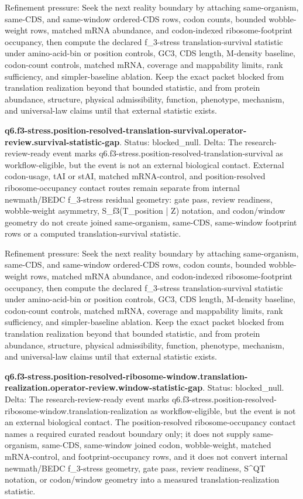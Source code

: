 Refinement pressure: Seek the next reality boundary by attaching same-organism, same-CDS, and same-window ordered-CDS rows, codon counts, bounded wobble-weight rows, matched mRNA abundance, and codon-indexed ribosome-footprint occupancy, then compute the declared f\_3-stress translation-survival statistic under amino-acid-bin or position controls, GC3, CDS length, M-density baseline, codon-count controls, matched mRNA, coverage and mappability limits, rank sufficiency, and simpler-baseline ablation. Keep the exact packet blocked from translation realization beyond that bounded statistic, and from protein abundance, structure, physical admissibility, function, phenotype, mechanism, and universal-law claims until that external statistic exists.

\textbf{q6.f3-stress.position-resolved-translation-survival.operator-review.survival-statistic-gap}. Status: blocked\_null. Delta: The research-review-ready event marks q6.f3-stress.position-resolved-translation-survival as workflow-eligible, but the event is not an external biological contact. External codon-usage, tAI or stAI, matched mRNA-control, and position-resolved ribosome-occupancy contact routes remain separate from internal newmath/BEDC f\_3-stress residual geometry: gate pass, review readiness, wobble-weight asymmetry, S\_f3(T\_position | Z) notation, and codon/window geometry do not create joined same-organism, same-CDS, same-window footprint rows or a computed translation-survival statistic.

Refinement pressure: Seek the next reality boundary by attaching same-organism, same-CDS, and same-window ordered-CDS rows, codon counts, bounded wobble-weight rows, matched mRNA abundance, and codon-indexed ribosome-footprint occupancy, then compute the declared f\_3-stress translation-survival statistic under amino-acid-bin or position controls, GC3, CDS length, M-density baseline, codon-count controls, matched mRNA, coverage and mappability limits, rank sufficiency, and simpler-baseline ablation. Keep the exact packet blocked from translation realization beyond that bounded statistic, and from protein abundance, structure, physical admissibility, function, phenotype, mechanism, and universal-law claims until that external statistic exists.

\textbf{q6.f3-stress.position-resolved-ribosome-window.translation-realization.operator-review.window-statistic-gap}. Status: blocked\_null. Delta: The research-review-ready event marks q6.f3-stress.position-resolved-ribosome-window.translation-realization as workflow-eligible, but the event is not an external biological contact. The position-resolved ribosome-occupancy contact names a required curated readout boundary only; it does not supply same-organism, same-CDS, same-window joined codon, wobble-weight, matched mRNA-control, and footprint-occupancy rows, and it does not convert internal newmath/BEDC f\_3-stress geometry, gate pass, review readiness, S\textasciicircum{}QT notation, or codon/window geometry into a measured translation-realization statistic.

